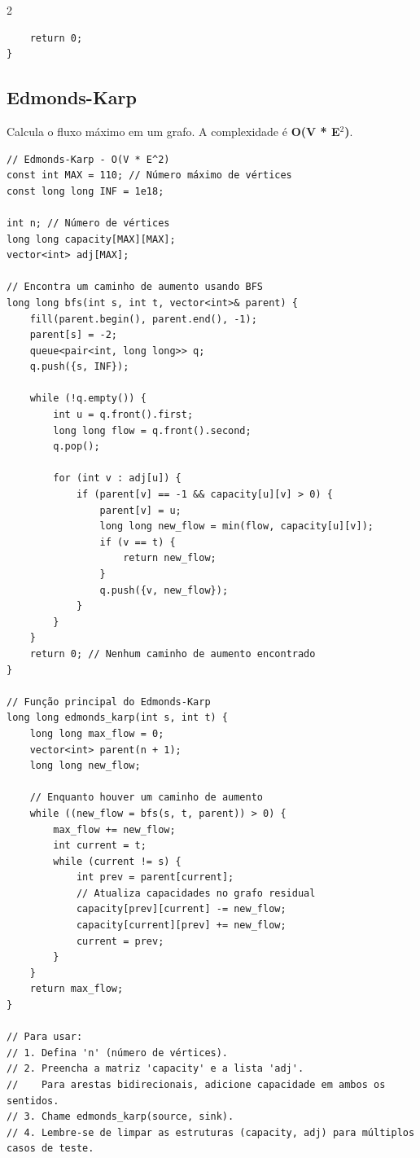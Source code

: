 \documentclass[11pt]{article}
\begin{document}
\begin{multicols}{2}
\begin{lstlisting}
    return 0;
}
\end{lstlisting}

\subsection{Edmonds-Karp}
Calcula o fluxo máximo em um grafo. A complexidade é \textbf{O(V * E$^2$)}.
\begin{lstlisting}
// Edmonds-Karp - O(V * E^2)
const int MAX = 110; // Número máximo de vértices
const long long INF = 1e18;

int n; // Número de vértices
long long capacity[MAX][MAX];
vector<int> adj[MAX];

// Encontra um caminho de aumento usando BFS
long long bfs(int s, int t, vector<int>& parent) {
    fill(parent.begin(), parent.end(), -1);
    parent[s] = -2;
    queue<pair<int, long long>> q;
    q.push({s, INF});

    while (!q.empty()) {
        int u = q.front().first;
        long long flow = q.front().second;
        q.pop();

        for (int v : adj[u]) {
            if (parent[v] == -1 && capacity[u][v] > 0) {
                parent[v] = u;
                long long new_flow = min(flow, capacity[u][v]);
                if (v == t) {
                    return new_flow;
                }
                q.push({v, new_flow});
            }
        }
    }
    return 0; // Nenhum caminho de aumento encontrado
}

// Função principal do Edmonds-Karp
long long edmonds_karp(int s, int t) {
    long long max_flow = 0;
    vector<int> parent(n + 1);
    long long new_flow;

    // Enquanto houver um caminho de aumento
    while ((new_flow = bfs(s, t, parent)) > 0) {
        max_flow += new_flow;
        int current = t;
        while (current != s) {
            int prev = parent[current];
            // Atualiza capacidades no grafo residual
            capacity[prev][current] -= new_flow;
            capacity[current][prev] += new_flow;
            current = prev;
        }
    }
    return max_flow;
}

// Para usar:
// 1. Defina 'n' (número de vértices).
// 2. Preencha a matriz 'capacity' e a lista 'adj'.
//    Para arestas bidirecionais, adicione capacidade em ambos os sentidos.
// 3. Chame edmonds_karp(source, sink).
// 4. Lembre-se de limpar as estruturas (capacity, adj) para múltiplos casos de teste.
\end{lstlisting}


\end{multicols}
\end{document}

